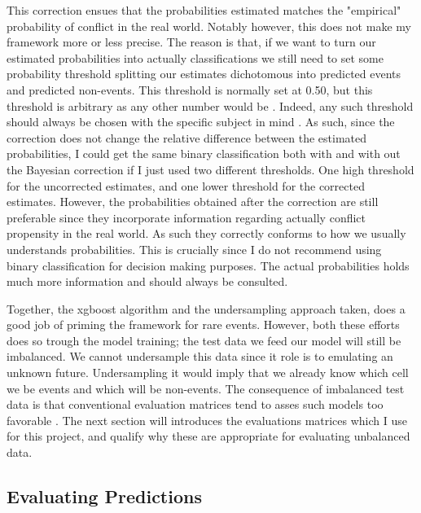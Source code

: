 \documentclass[a4paper]{article}
\begin{document}
This correction ensues that the probabilities estimated matches the "empirical" probability of conflict in the real world. Notably however, this does not make my framework more or less precise. The reason is that, if we want to turn our estimated probabilities into actually classifications we still need to set some probability threshold splitting our estimates dichotomous into predicted events and predicted non-events. This threshold is normally set at 0.50, but this threshold is arbitrary as any other number would be \citep[890-891]{weidmann_ward_2010predicting}. Indeed, any such threshold should always be chosen with the specific subject in mind \citep[194]{Goldstone_2010}. As such, since the correction does not change the relative difference between the estimated probabilities, I could get the same binary classification both with and with out the Bayesian correction if I just used two different thresholds. One high threshold for the uncorrected estimates, and one lower threshold for the corrected estimates. However, the probabilities obtained after the correction are still preferable since they incorporate information regarding actually conflict propensity in the real world. As such they correctly conforms to how we usually understands probabilities. This is crucially since I do not recommend using binary classification for decision making purposes. The actual probabilities holds much more information and should always be consulted.\par

Together, the xgboost algorithm and the undersampling approach taken, does a good job of priming the framework for rare events. However, both these efforts does so trough the model training; the test data we feed our model will still be imbalanced. We cannot undersample this data since it role is to emulating an unknown future. Undersampling it would imply that we already know which cell we be events and which will be non-events. The consequence of imbalanced test data is that conventional evaluation matrices tend to asses such models too favorable \citep[1264]{He_2008}. The next section will introduces the evaluations matrices which I use for this project, and qualify why these are appropriate for evaluating unbalanced data.\par


\subsection{Evaluating Predictions}
\end{document}
